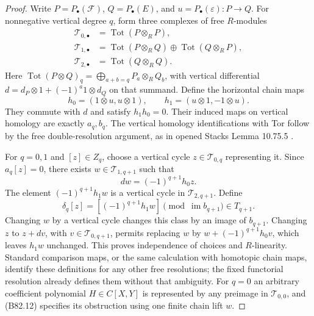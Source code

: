 \begin{proof}
Write $P=P_\bullet(\mathcal F)$, $Q=P_\bullet(E)$, and
$u=P_\bullet(\varepsilon):P\to Q$. For nonnegative vertical degree
$q$, form three complexes of free $R$-modules
\[
\begin{aligned}
 \mathcal T_{0,\bullet}&=\operatorname{Tot}(P\otimes_RP),\\
 \mathcal T_{1,\bullet}&=\operatorname{Tot}(P\otimes_RQ)
                         \oplus\operatorname{Tot}(Q\otimes_RP),\\
 \mathcal T_{2,\bullet}&=\operatorname{Tot}(Q\otimes_RQ).
\end{aligned}                                           \tag{B82.10}
\]
Here $\operatorname{Tot}(P\otimes Q)_q=
\bigoplus_{a+b=q}P_a\otimes_RQ_b$, with vertical differential
$d=d_P\otimes1+(-1)^a1\otimes d_Q$ on that summand.
Define the horizontal chain maps
\[
 h_0=(1\otimes u,u\otimes1),\qquad
 h_1=(u\otimes1,-1\otimes u).                            \tag{B82.11}
\]
They commute with $d$ and satisfy $h_1h_0=0$.
Their induced maps on vertical homology are exactly $a_q,b_q$.
The vertical homology identifications with Tor follow by the free
double-resolution argument, as in opened Stacks Lemma 10.75.5
\cite{StacksTor}.

For $q=0,1$ and $[z]\in Z_q$, choose a vertical cycle
$z\in\mathcal T_{0,q}$ representing it. Since $a_q[z]=0$,
there exists $w\in\mathcal T_{1,q+1}$ such that
\[
                dw=(-1)^{q+1}h_0z.
\]
The element $(-1)^{q+1}h_1w$ is a vertical cycle in
$\mathcal T_{2,q+1}$. Define
\[
        \delta_q[z]=[(-1)^{q+1}h_1w]
                  \pmod{\operatorname{im}b_{q+1}}\in T_{q+1}.
                                                        \tag{B82.12}
\]
Changing $w$ by a vertical cycle changes this class by an image of
$b_{q+1}$. Changing $z$ to $z+dv$, with
$v\in\mathcal T_{0,q+1}$, permits replacing $w$ by
$w+(-1)^{q+1}h_0v$, which leaves $h_1w$ unchanged.
This proves independence of choices and $R$-linearity. Standard
comparison maps, or the same calculation with homotopic chain maps,
identify these definitions for any other free resolutions; the fixed
functorial resolution already defines them without that ambiguity.
For $q=0$ an arbitrary coefficient polynomial $H\in C[X,Y]$ is
represented by any preimage in $\mathcal T_{0,0}$, and (B82.12)
specifies its obstruction using one finite chain lift $w$.


\end{proof}

